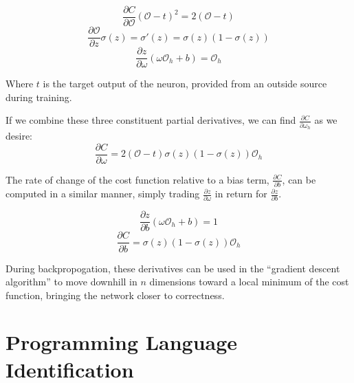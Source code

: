 \documentclass{article}
\begin{document}
$$\frac{\partial{C}}{\partial{\mathcal{O}}}(\mathcal{O}-t)^2=2(\mathcal{O}-t)$$
$$\frac{\partial{\mathcal{O}}}{\partial{z}}\sigma(z)=\sigma'(z)=\sigma(z)(1-\sigma(z))$$
$$\frac{\partial{z}}{\partial{\omega}}(\omega\mathcal{O}_h+b)=\mathcal{O}_h$$

Where $t$ is the target output of the neuron, provided from an outside source during training.

If we combine these three constituent partial derivatives, we can find $\frac{\partial{C}}{\partial{\omega_h}}$ as we desire:
$$\frac{\partial{C}}{\partial{\omega}}=2(\mathcal{O}-t)\sigma(z)(1-\sigma(z))\mathcal{O}_h$$

The rate of change of the cost function relative to a bias term, $\frac{\partial{C}}{\partial{b}}$, can be computed in a similar manner, simply trading $\frac{\partial{z}}{\partial{\omega}}$ in return for $\frac{\partial{z}}{\partial{b}}$.

$$\frac{\partial{z}}{\partial{b}}(\omega\mathcal{O}_h+b)=1$$
$$\frac{\partial{C}}{\partial{b}}=\sigma(z)(1-\sigma(z))\mathcal{O}_h$$

During backpropogation, these derivatives can be used in the ``gradient descent algorithm'' to move downhill in $n$ dimensions toward a local minimum of the cost function, bringing the network closer to correctness.

\section{Programming Language Identification}
\end{document}

